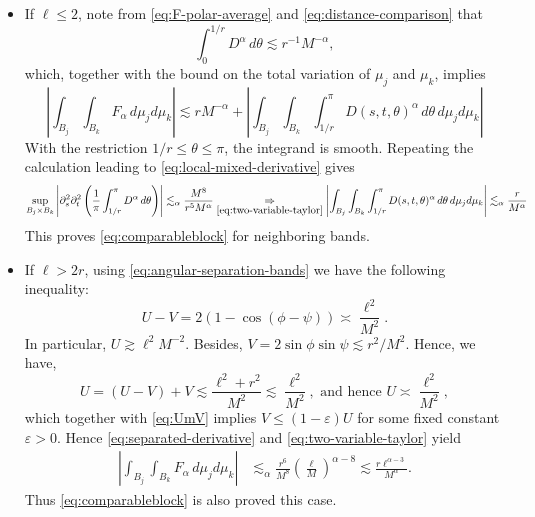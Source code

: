 \documentclass[11pt]{amsart}
\begin{document}
\begin{itemize}
\begin{itemize}
Indeed, relative to the first term, the other contributions are
bounded by constants times $\ell/r$ and, respectively,
$(\ell/r)^2$, $(\ell/r)^2\log(2+r/\ell)$, or
$(\ell/r)^{3-\alpha}$; all are bounded for $0<\ell/r\le2$.
Combining \eqref{eq:two-variable-taylor} and \eqref{eq:local-mixed-derivative}, we find
\begin{align*}
 \left|
 \int_{B_j}\int_{B_k}F_\alpha\,d\mu_jd\mu_k
 \right|
 \lesssim_\alpha& \frac{r\ell^{\alpha-3}}{M^\alpha},
\end{align*}
proving \eqref{eq:comparableblock}.
\item[$\star$]
If $\ell\le2$, note from \eqref{eq:F-polar-average} and \eqref{eq:distance-comparison} that
\[
\int_0^{1/r}D^\alpha\,d\theta\lesssim r^{-1}M^{-\alpha},
\]
which, together with the bound on the total variation of $\mu_j$ and $\mu_k$, implies
\[
\left| \int_{B_j}\int_{B_k}F_\alpha\,d\mu_jd\mu_k
 \right|
 \lesssim rM^{-\alpha}+
 \left|
\int_{B_j}\int_{B_k}\int_{1/r}^\pi D(s,t,\theta)^\alpha\,d\theta\,d\mu_jd\mu_k
 \right|
\]
With the restriction $1/r\le\theta\le\pi$, the integrand is smooth. Repeating the
calculation leading to \eqref{eq:local-mixed-derivative} gives
\[
 \sup_{B_j\times B_k}
 \left|\partial_s^2\partial_t^2
 \left(\frac1\pi\int_{1/r}^\pi D^\alpha\,d\theta\right)
 \right|
 \lesssim_\alpha \frac{M^8}{r^5M^\alpha}\underset{\eqref{eq:two-variable-taylor}}{\Rightarrow}
 \left|
\int_{B_j}\int_{B_k}\int_{1/r}^\pi D(s,t,\theta)^\alpha\,d\theta\,d\mu_jd\mu_k
 \right|\lesssim_\alpha \frac{r}{M^\alpha}
\]
This proves \eqref{eq:comparableblock} for neighboring bands.

\item[$\star$] If $\ell>2r$, using \eqref{eq:angular-separation-bands} we have the following inequality:
\begin{equation}\label{eq:UmV}
 U-V=2(1-\cos(\phi-\psi))\asymp\frac{\ell^2}{M^2}.
\end{equation}
In particular, $U\gtrsim \ell^2M^{-2}$. Besides, $V=2\sin\phi\sin\psi\lesssim r^2/M^2$. Hence, we have,
\[
U=(U-V)+V\lesssim \frac{\ell^2+r^2}{M^2}\lesssim\frac{\ell^2}{M^2},\text{ and hence }U\asymp \frac{\ell^2}{M^2},
\]
which together with \eqref{eq:UmV} implies $V\le(1-\varepsilon)U$ for some fixed constant $\varepsilon>0$. Hence \eqref{eq:separated-derivative} and
\eqref{eq:two-variable-taylor} yield
\begin{align*}
 \left|
 \int_{B_j}\int_{B_k}F_\alpha\,d\mu_jd\mu_k
 \right|
 &\lesssim_\alpha
 \frac{r^6}{M^8}
 \left(\frac\ell M\right)^{\alpha-8}\lesssim\frac{r\ell^{\alpha-3}}{M^\alpha}.
\end{align*}
Thus \eqref{eq:comparableblock} is also proved  this case.
\end{itemize}
\end{itemize}
\end{document}

